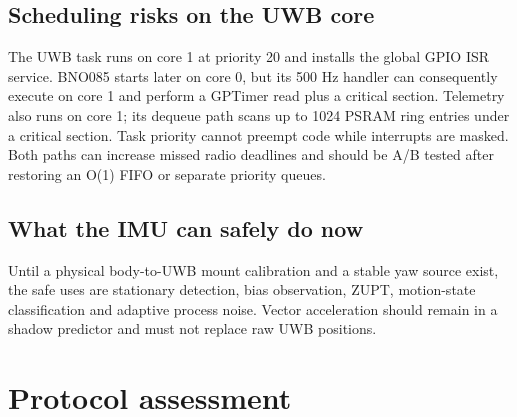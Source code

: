 \documentclass[10pt,a4paper]{article}
\begin{document}
\subsection{Scheduling risks on the UWB core}
The UWB task runs on core 1 at priority 20 and installs the global GPIO ISR
service. BNO085 starts later on core 0, but its 500 Hz handler can consequently
execute on core 1 and perform a GPTimer read plus a critical section. Telemetry
also runs on core 1; its dequeue path scans up to 1024 PSRAM ring entries under
a critical section. Task priority cannot preempt code while interrupts are
masked. Both paths can increase missed radio deadlines and should be A/B tested
after restoring an O(1) FIFO or separate priority queues.

\subsection{What the IMU can safely do now}
Until a physical body-to-UWB mount calibration and a stable yaw source exist,
the safe uses are stationary detection, bias observation, ZUPT, motion-state
classification and adaptive process noise. Vector acceleration should remain
in a shadow predictor and must not replace raw UWB positions.

\section{Protocol assessment}

\begin{center}\small{}
\end{center}
\end{document}
